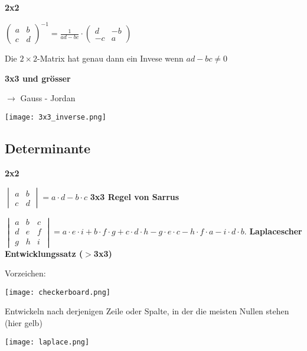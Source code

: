 \begin{multicols*}{3}
    \textbf{2x2}

    {\large$\begin{pmatrix}
            a & b \\
            c & d
        \end{pmatrix}^{-1} = \frac{1}{ad-bc}\cdot\begin{pmatrix}
            d  & -b \\
            -c & a
        \end{pmatrix}$}

    {Die $2\times2$-Matrix hat genau dann ein Invese wenn $ad-bc \neq 0$}

    \textbf{3x3 und grösser}

    {$\rightarrow$ Gauss - Jordan}

    \texttt{[image: 3x3\_inverse.png]}
    \WhiteSpace

    \subsection{Determinante}
    {\textbf{2x2}}

    $\begin{vmatrix}
            a & b \\
            c & d
        \end{vmatrix} = a\cdot d - b\cdot c $
    \WhiteSpace
    \textbf{3x3 Regel von Sarrus}

    $\begin{vmatrix} a & b & c \\ d & e & f \\ g & h &i \end{vmatrix} = a \cdot e \cdot i + b \cdot f \cdot g + c \cdot d \cdot h - g \cdot e \cdot c - h \cdot f \cdot a - i \cdot d \cdot b.$
    \WhiteSpace
    \textbf{Laplacescher Entwicklungssatz ($ >$3x3)}

    {\begin{multicols}{2}
            Vorzeichen:

            \columnbreak
            { \texttt{[image: checkerboard.png]} }

        \end{multicols}}

    {{Entwickeln nach derjenigen Zeile oder Spalte, in
                der die meisten Nullen stehen (hier gelb)}}
    {\begin{multicols}{2}
            {\texttt{[image: laplace.png]}}
            \columnbreak


\end{multicols}}
\end{multicols*}
